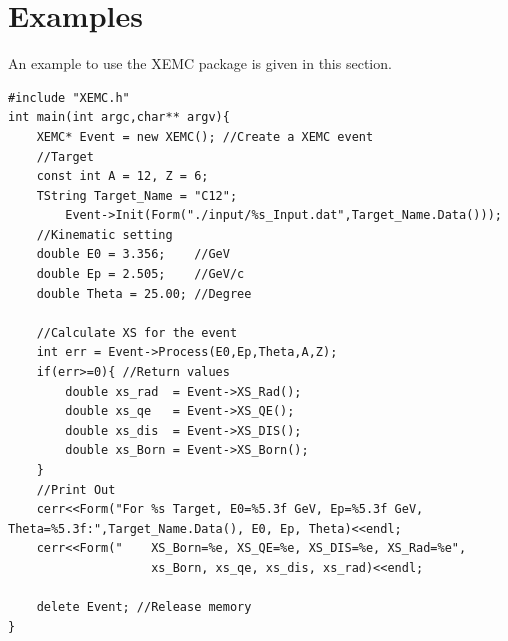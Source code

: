 \newpage
\section{Examples}
 An example to use the XEMC package is given in this section. 
 \begin{lstlisting}
#include "XEMC.h"
int main(int argc,char** argv){
	XEMC* Event = new XEMC(); //Create a XEMC event
	//Target
	const int A = 12, Z = 6;    
	TString Target_Name = "C12";
    	Event->Init(Form("./input/%s_Input.dat",Target_Name.Data()));	
 	//Kinematic setting	
	double E0 = 3.356;    //GeV
	double Ep = 2.505;    //GeV/c
	double Theta = 25.00; //Degree
		
	//Calculate XS for the event
	int err = Event->Process(E0,Ep,Theta,A,Z);	
	if(err>=0){ //Return values
		double xs_rad  = Event->XS_Rad();
		double xs_qe   = Event->XS_QE();
		double xs_dis  = Event->XS_DIS();
		double xs_Born = Event->XS_Born();
	}
	//Print Out
	cerr<<Form("For %s Target, E0=%5.3f GeV, Ep=%5.3f GeV, Theta=%5.3f:",Target_Name.Data(), E0, Ep, Theta)<<endl;
	cerr<<Form("    XS_Born=%e, XS_QE=%e, XS_DIS=%e, XS_Rad=%e",
                    xs_Born, xs_qe, xs_dis, xs_rad)<<endl;	
	
	delete Event; //Release memory
}
\end{lstlisting}